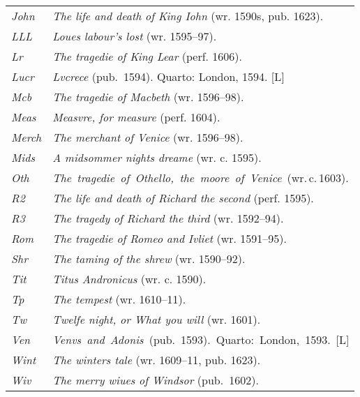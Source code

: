 \begin{xltabular}{\textwidth}{ lQ }
\hspace{1em}\textit{John} & \textit{The life and death of King Iohn} (wr. 1590s, pub. 1623). \\
\hspace{1em}\textit{LLL} & \textit{Loues labour's lost} (wr. 1595--97). \\
\hspace{1em}\textit{Lr} & \textit{The tragedie of King Lear} (perf. 1606). \\
\hspace{1em}\textit{Lucr} & \textit{Lvcrece} (pub.~1594). Quarto: London, 1594. [L] \\ %
\hspace{1em}\textit{Mcb} & \textit{The tragedie of Macbeth} (wr. 1596--98). \\
\hspace{1em}\textit{Meas} & \textit{Measvre, for measure} (perf. 1604). \\ %
\hspace{1em}\textit{Merch} & \textit{The merchant of Venice} (wr. 1596--98). \\
\hspace{1em}\textit{Mids} & \textit{A midsommer nights dreame}  (wr. c. 1595). \\ %
\hspace{1em}\textit{Oth} & \mbox{\textit{The tragedie of Othello, the moore of Venice} (wr.\,c.\,1603).}\\
\hspace{1em}\textit{R2} & \textit{The life and death of Richard the second} (perf. 1595). \\
\hspace{1em}\textit{R3} & \textit{The tragedy of Richard the third} (wr. 1592--94).  \\
\hspace{1em}\textit{Rom} & \textit{The tragedie of Romeo and Ivliet} (wr. 1591--95). \\
\hspace{1em}\textit{Shr} & \textit{The taming of the shrew} (wr. 1590--92). \\
\hspace{1em}\textit{Tit} & \textit{Titus Andronicus} (wr. c. 1590). \\
\hspace{1em}\textit{Tp} & \textit{The tempest} (wr. 1610--11). \\
\hspace{1em}\textit{Tw} & \textit{Twelfe night, or What you will} (wr. 1601). \\
\hspace{1em}\textit{Ven} & \mbox{\textit{Venvs and Adonis} (pub.~1593). Quarto: London, 1593. [L]}\\
\hspace{1em}\textit{Wint} & \textit{The winters tale} (wr. 1609--11, pub. 1623). \\
\hspace{1em}\textit{Wiv} & \textit{The merry wiues of Windsor} (pub.~1602). \\


\end{xltabular}
